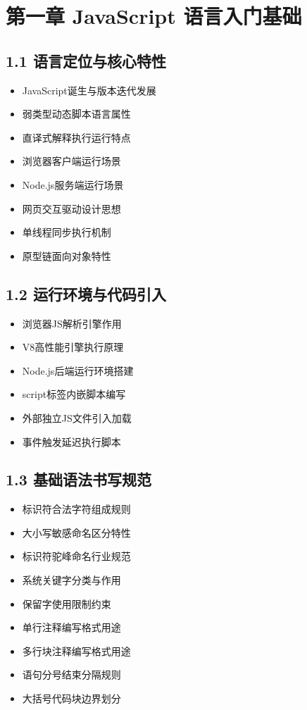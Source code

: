 
\section{第一章 JavaScript 语言入门基础}
\subsection{1.1 语言定位与核心特性}
\begin{itemize}
\item JavaScript诞生与版本迭代发展
\item 弱类型动态脚本语言属性
\item 直译式解释执行运行特点
\item 浏览器客户端运行场景
\item Node.js服务端运行场景
\item 网页交互驱动设计思想
\item 单线程同步执行机制
\item 原型链面向对象特性
\end{itemize}

\subsection{1.2 运行环境与代码引入}
\begin{itemize}
\item 浏览器JS解析引擎作用
\item V8高性能引擎执行原理
\item Node.js后端运行环境搭建
\item script标签内嵌脚本编写
\item 外部独立JS文件引入加载
\item 事件触发延迟执行脚本
\end{itemize}

\subsection{1.3 基础语法书写规范}
\begin{itemize}
\item 标识符合法字符组成规则
\item 大小写敏感命名区分特性
\item 标识符驼峰命名行业规范
\item 系统关键字分类与作用
\item 保留字使用限制约束
\item 单行注释编写格式用途
\item 多行块注释编写格式用途
\item 语句分号结束分隔规则
\item 大括号代码块边界划分
\end{itemize}

